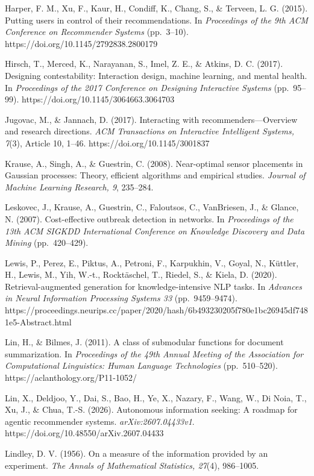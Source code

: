 \documentclass[
  11pt]{article}
\begin{document}
Harper, F. M., Xu, F., Kaur, H., Condiff, K., Chang, S., \& Terveen, L.
G. (2015). Putting users in control of their recommendations. In
\emph{Proceedings of the 9th ACM Conference on Recommender Systems}
(pp.~3--10). https://doi.org/10.1145/2792838.2800179

Hirsch, T., Merced, K., Narayanan, S., Imel, Z. E., \& Atkins, D. C.
(2017). Designing contestability: Interaction design, machine learning,
and mental health. In \emph{Proceedings of the 2017 Conference on
Designing Interactive Systems} (pp.~95--99).
https://doi.org/10.1145/3064663.3064703

Jugovac, M., \& Jannach, D. (2017). Interacting with
recommenders---Overview and research directions. \emph{ACM Transactions
on Interactive Intelligent Systems, 7}(3), Article 10, 1--46.
https://doi.org/10.1145/3001837

Krause, A., Singh, A., \& Guestrin, C. (2008). Near-optimal sensor
placements in Gaussian processes: Theory, efficient algorithms and
empirical studies. \emph{Journal of Machine Learning Research, 9},
235--284.

Leskovec, J., Krause, A., Guestrin, C., Faloutsos, C., VanBriesen, J.,
\& Glance, N. (2007). Cost-effective outbreak detection in networks. In
\emph{Proceedings of the 13th ACM SIGKDD International Conference on
Knowledge Discovery and Data Mining} (pp.~420--429).

Lewis, P., Perez, E., Piktus, A., Petroni, F., Karpukhin, V., Goyal, N.,
Küttler, H., Lewis, M., Yih, W.-t., Rocktäschel, T., Riedel, S., \&
Kiela, D. (2020). Retrieval-augmented generation for knowledge-intensive
NLP tasks. In \emph{Advances in Neural Information Processing Systems
33} (pp.~9459--9474).
https://proceedings.neurips.cc/paper/2020/hash/6b493230205f780e1bc26945df7481e5-Abstract.html

Lin, H., \& Bilmes, J. (2011). A class of submodular functions for
document summarization. In \emph{Proceedings of the 49th Annual Meeting
of the Association for Computational Linguistics: Human Language
Technologies} (pp.~510--520). https://aclanthology.org/P11-1052/

Lin, X., Deldjoo, Y., Dai, S., Bao, H., Ye, X., Nazary, F., Wang, W., Di
Noia, T., Xu, J., \& Chua, T.-S. (2026). Autonomous information seeking:
A roadmap for agentic recommender systems. \emph{arXiv:2607.04433v1}.
https://doi.org/10.48550/arXiv.2607.04433

Lindley, D. V. (1956). On a measure of the information provided by an
experiment. \emph{The Annals of Mathematical Statistics, 27}(4),
986--1005.
\end{document}
